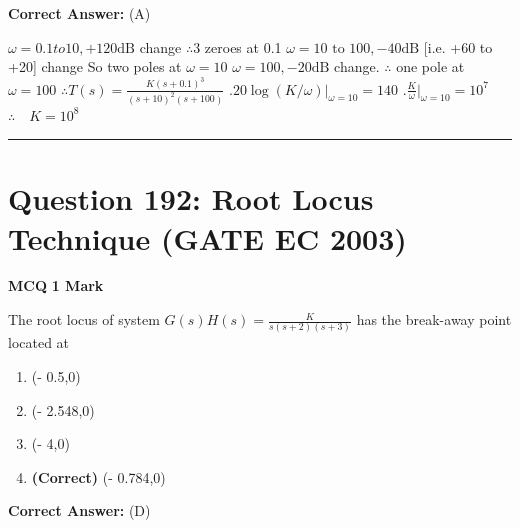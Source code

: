 \documentclass[11pt,a4paper]{article}
\begin{document}
\noindent \textbf{Correct Answer:} (A)

\begin{tcolorbox}[solbox, title=Detailed Solution -- Question 191]
$\omega=0.1 to 10,+120 \mathrm{dB}$ change
$\therefore$3 zeroes at 0.1
$\omega=10 \text { to } 100,-40 \mathrm{dB}$
 [i.e. +60 to +20] change 
 So two poles at $\omega=10$
$\omega=100,-20 \mathrm{dB}$ change.
$\therefore$ one pole at $\omega=100$
$\therefore T(s)=\frac{K(s+0.1)^{3}}{(s+10)^{2}(s+100)}$
$.20 \log (K / \omega)|_{\omega=10}=140$
$.\frac{K}{\omega}|_{\omega=10}=10^{7}$
$\therefore \quad K=10^{8}$
\end{tcolorbox}

\vspace{1.5em}
\hrule
\vspace{1.5em}

\section*{Question 192: Root Locus Technique (GATE EC 2003)}
\noindent \textbf{\color{primary}MCQ} \hfill \textbf{\color{secondary}1 Mark}


\noindent The root locus of system $G(s)H(s)=\frac{K}{s(s+2)(s+3)}$ has the break-away point
located at


\begin{enumerate}[label=(\Alph*)]
    \item (- 0.5,0)
    \item (- 2.548,0)
    \item (- 4,0)
    \item \textbf{(Correct)} (- 0.784,0)
\end{enumerate}

\noindent \textbf{Correct Answer:} (D)
\end{document}
